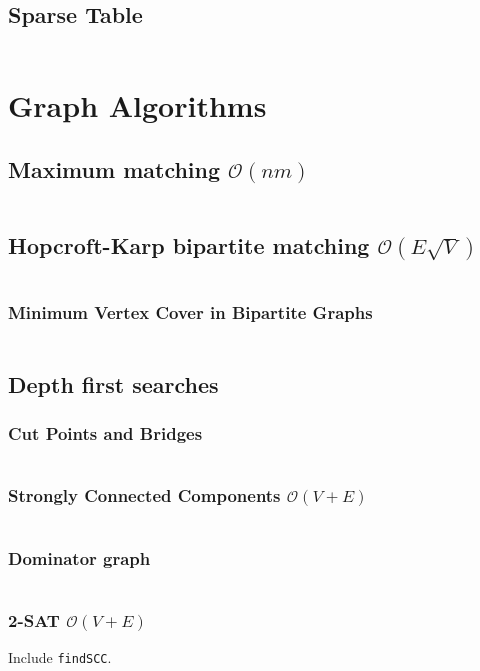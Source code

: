 \documentclass[8pt,a4paper,landscape,oneside]{amsart}
\newcommand{\code}[1]{\inputminted[fontsize=\normalsize,baselinestretch=1,breaklines,tabsize=2]{cpp}{code/#1}}
\begin{document}
\begin{multicols*}{3}
\subsection{Sparse Table}
	\code{datastructures/sparse_table.cpp}

\section{Graph Algorithms}
\subsection{Maximum matching $\mathcal{O}(n m)$}
\code{graphs/maxmatch.cpp}

\subsection{Hopcroft-Karp bipartite matching $\mathcal{O}(E \sqrt{V})$}
\code{graphs/hopcroft_karp.cpp}

\subsubsection{Minimum Vertex Cover in Bipartite Graphs}
\code{graphs/bipartite_mvc.cpp}

\subsection{Depth first searches}

\subsubsection{Cut Points and Bridges}
\code{graphs/cut_points_and_bridges.cpp}

\subsubsection{Strongly Connected Components $\mathcal{O}(V + E)$}
\code{graphs/scc.cpp}

\subsubsection{Dominator graph}
\code{graphs/dominator.cpp}

\subsubsection{2-SAT $\mathcal{O}(V+E)$}
Include \texttt{findSCC}.
\code{satsolver.cpp}


\end{multicols*}
\end{document}
